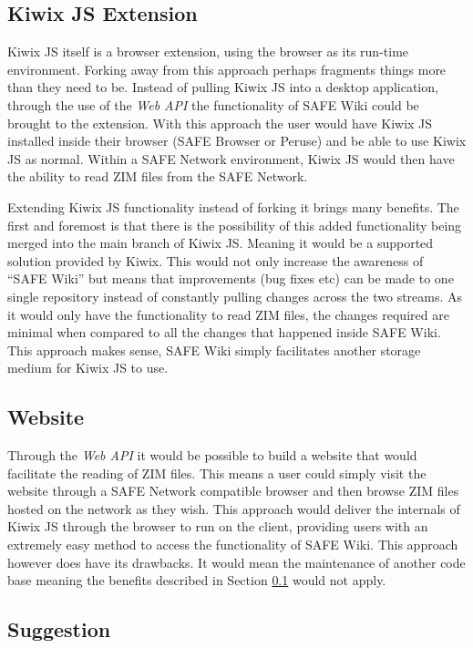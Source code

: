 \subsection{Kiwix JS Extension}
\label{subsec:kiwix-js-safe}

Kiwix JS itself is a browser extension, using the browser as its run-time environment. Forking away from this approach perhaps fragments things more than they need to be. Instead of pulling Kiwix JS into a desktop application, through the use of the \textit{Web API} the functionality of SAFE Wiki could be brought to the extension. With this approach the user would have Kiwix JS installed inside their browser (SAFE Browser or Peruse) and be able to use Kiwix JS as normal. Within a SAFE Network environment, Kiwix JS would then have the ability to read ZIM files from the SAFE Network.

Extending Kiwix JS functionality instead of forking it brings many benefits. The first and foremost is that there is the possibility of this added functionality being merged into the main branch of Kiwix JS. Meaning it would be a supported solution provided by Kiwix. This would not only increase the awareness of ``SAFE Wiki'' but means that improvements (bug fixes etc) can be made to one single repository instead of constantly pulling changes across the two streams. As it would only have the functionality to read ZIM files, the changes required are minimal when compared to all the changes that happened inside SAFE Wiki. This approach makes sense, SAFE Wiki simply facilitates another storage medium for Kiwix JS to use.

\subsection{Website}

Through the \textit{Web API} it would be possible to build a website that would facilitate the reading of ZIM files. This means a user could simply visit the website through a SAFE Network compatible browser and then browse ZIM files hosted on the network as they wish. This approach would deliver the internals of Kiwix JS through the browser to run on the client, providing users with an extremely easy method to access the functionality of SAFE Wiki. This approach however does have its drawbacks. It would mean the maintenance of another code base meaning the benefits described in Section \ref{subsec:kiwix-js-safe} would not apply.

\subsection{Suggestion}

